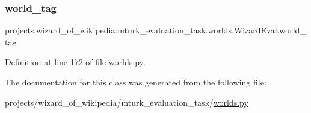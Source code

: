\subsubsection{\texorpdfstring{world\+\_\+tag}{world\_tag}}
{\footnotesize\ttfamily projects.\+wizard\+\_\+of\+\_\+wikipedia.\+mturk\+\_\+evaluation\+\_\+task.\+worlds.\+Wizard\+Eval.\+world\+\_\+tag}



Definition at line 172 of file worlds.\+py.



The documentation for this class was generated from the following file\+:\begin{DoxyCompactItemize}
\item 
projects/wizard\+\_\+of\+\_\+wikipedia/mturk\+\_\+evaluation\+\_\+task/\hyperlink{projects_2wizard__of__wikipedia_2mturk__evaluation__task_2worlds_8py}{worlds.\+py}\end{DoxyCompactItemize}
